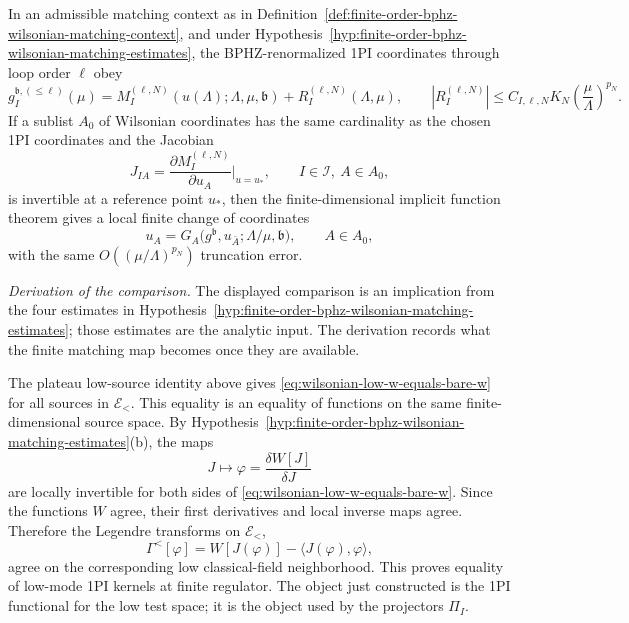 \begin{controlledapproximation}
\label{capprox:finite-order-bphz-wilsonian-matching}
In an admissible matching context as in
Definition~\ref{def:finite-order-bphz-wilsonian-matching-context}, and under
Hypothesis~\ref{hyp:finite-order-bphz-wilsonian-matching-estimates}, the
BPHZ-renormalized 1PI coordinates through loop order \(\ell\) obey
\begin{equation}
  g_I^{\mathfrak b,(\leq\ell)}(\mu)
  =
  M_I^{(\ell,N)}(u(\Lambda);\Lambda,\mu,\mathfrak b)
  +
  R_I^{(\ell,N)}(\Lambda,\mu),
  \qquad
  |R_I^{(\ell,N)}|
  \leq
  C_{I,\ell,N}K_N
  \left(\frac{\mu}{\Lambda}\right)^{p_N}.
  \label{eq:finite-order-bphz-wilsonian-coordinate-comparison}
\end{equation}
If a sublist \(A_0\) of Wilsonian coordinates has the same cardinality as the
chosen 1PI coordinates and the Jacobian
\[
  J_{IA}
  =
  \frac{\partial M_I^{(\ell,N)}}{\partial u_A}
  \bigg|_{u=u_*},
  \qquad
  I\in\mathcal I,\ A\in A_0,
\]
is invertible at a reference point \(u_*\), then the finite-dimensional
implicit function theorem gives a local finite change of coordinates
\[
  u_A
  =
  G_A\bigl(g^{\mathfrak b},u_{\bar A};\Lambda/\mu,\mathfrak b\bigr),
  \qquad A\in A_0,
\]
with the same \(O((\mu/\Lambda)^{p_N})\) truncation error.
\end{controlledapproximation}

\noindent\emph{Derivation of the comparison.}
The displayed comparison is an implication from the four estimates in
Hypothesis~\ref{hyp:finite-order-bphz-wilsonian-matching-estimates}; those
estimates are the analytic input.  The derivation records what the finite
matching map becomes once they are available.

The plateau low-source identity above gives
\eqref{eq:wilsonian-low-w-equals-bare-w} for all sources in \(\mathcal E_<\).
This equality is an equality of functions on the same finite-dimensional
source space.  By
Hypothesis~\ref{hyp:finite-order-bphz-wilsonian-matching-estimates}\textup{(b)},
the maps
\[
  J\longmapsto \varphi=\frac{\delta W[J]}{\delta J}
\]
are locally invertible for both sides of
\eqref{eq:wilsonian-low-w-equals-bare-w}.  Since the functions \(W\) agree,
their first derivatives and local inverse maps agree.  Therefore the
Legendre transforms on \(\mathcal E_<\),
\[
  \Gamma^<[\varphi]=W[J(\varphi)]-\langle J(\varphi),\varphi\rangle ,
\]
agree on the corresponding low classical-field neighborhood.  This proves
equality of low-mode 1PI kernels at finite regulator.  The object just
constructed is the 1PI functional for the low test space; it is the object
used by the projectors \(\Pi_I\).

